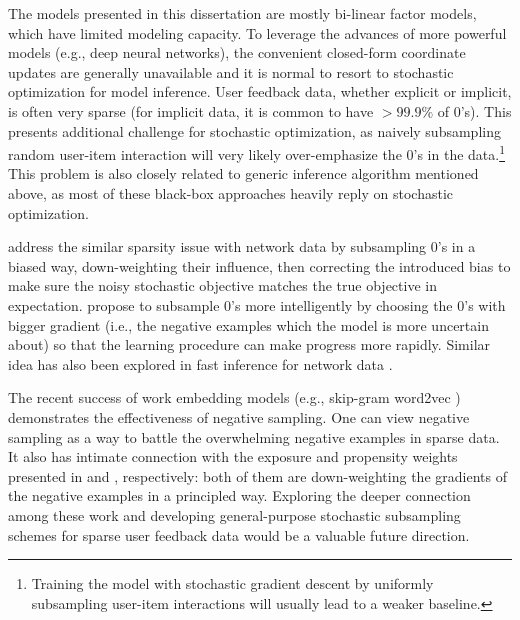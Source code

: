 The models presented in this dissertation are mostly bi-linear factor models, which have limited modeling capacity. To leverage the advances of more powerful models (e.g., deep neural networks), the convenient closed-form coordinate updates are generally unavailable and it is normal to resort to stochastic optimization for model inference. User feedback data, whether explicit or implicit, is often very sparse (for implicit data, it is common to have $>99.9\%$ of 0's). This presents additional challenge for stochastic optimization, as naively subsampling random user-item interaction will very likely over-emphasize the 0's in the data.\footnote{Training the model with stochastic gradient descent by uniformly subsampling user-item interactions will usually lead to a weaker baseline.} This problem is also closely related to generic inference algorithm mentioned above, as most of these black-box approaches heavily reply on stochastic optimization.

\citet{gopalan2013efficient} address the similar sparsity issue with network data by subsampling 0's in a biased way, down-weighting their influence, then correcting the introduced bias to make sure the noisy stochastic objective matches the true objective in expectation. 
\citet{rendle2014improving} propose to subsample 0's more intelligently by choosing the 0's with bigger gradient (i.e., the negative examples which the model is more uncertain about) so that the learning procedure can make progress more rapidly. Similar idea has also been explored in fast inference for network data \citep{raftery2012fast}. 

The recent success of work embedding models (e.g., skip-gram word2vec \citep{mikolov2013distributed}) demonstrates the effectiveness of negative sampling. One can view negative sampling as a way to battle the overwhelming negative examples in sparse data. It also has intimate connection with the exposure and propensity weights presented in  and , respectively: both of them are down-weighting the gradients of the negative examples in a principled way. Exploring the deeper connection among these work and developing general-purpose stochastic subsampling schemes for sparse user feedback data would be a valuable future direction. 

